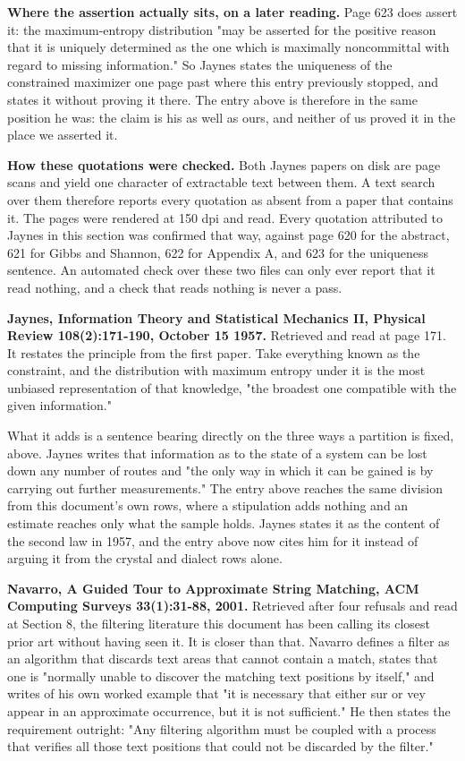 \textbf{Where the assertion actually sits, on a later reading.} Page 623 does assert it: the maximum-entropy distribution "may be asserted for the positive reason that it is uniquely determined as the one which is maximally noncommittal with regard to missing information." So Jaynes states the uniqueness of the constrained maximizer one page past where this entry previously stopped, and states it without proving it there. The entry above is therefore in the same position he was: the claim is his as well as ours, and neither of us proved it in the place we asserted it.

\textbf{How these quotations were checked.} Both Jaynes papers on disk are page scans and yield one character of extractable text between them. A text search over them therefore reports every quotation as absent from a paper that contains it. The pages were rendered at 150 dpi and read. Every quotation attributed to Jaynes in this section was confirmed that way, against page 620 for the abstract, 621 for Gibbs and Shannon, 622 for Appendix A, and 623 for the uniqueness sentence. An automated check over these two files can only ever report that it read nothing, and a check that reads nothing is never a pass.

\textbf{Jaynes, Information Theory and Statistical Mechanics II, Physical Review 108(2):171-190, October 15 1957.} Retrieved and read at page 171. It restates the principle from the first paper. Take everything known as the constraint, and the distribution with maximum entropy under it is the most unbiased representation of that knowledge, "the broadest one compatible with the given information."

What it adds is a sentence bearing directly on the three ways a partition is fixed, above. Jaynes writes that information as to the state of a system can be lost down any number of routes and "the only way in which it can be gained is by carrying out further measurements." The entry above reaches the same division from this document's own rows, where a stipulation adds nothing and an estimate reaches only what the sample holds. Jaynes states it as the content of the second law in 1957, and the entry above now cites him for it instead of arguing it from the crystal and dialect rows alone.

\textbf{Navarro, A Guided Tour to Approximate String Matching, ACM Computing Surveys 33(1):31-88, 2001.} Retrieved after four refusals and read at Section 8, the filtering literature this document has been calling its closest prior art without having seen it. It is closer than that. Navarro defines a filter as an algorithm that discards text areas that cannot contain a match, states that one is "normally unable to discover the matching text positions by itself," and writes of his own worked example that "it is necessary that either sur or vey appear in an approximate occurrence, but it is not sufficient." He then states the requirement outright: "Any filtering algorithm must be coupled with a process that verifies all those text positions that could not be discarded by the filter."

